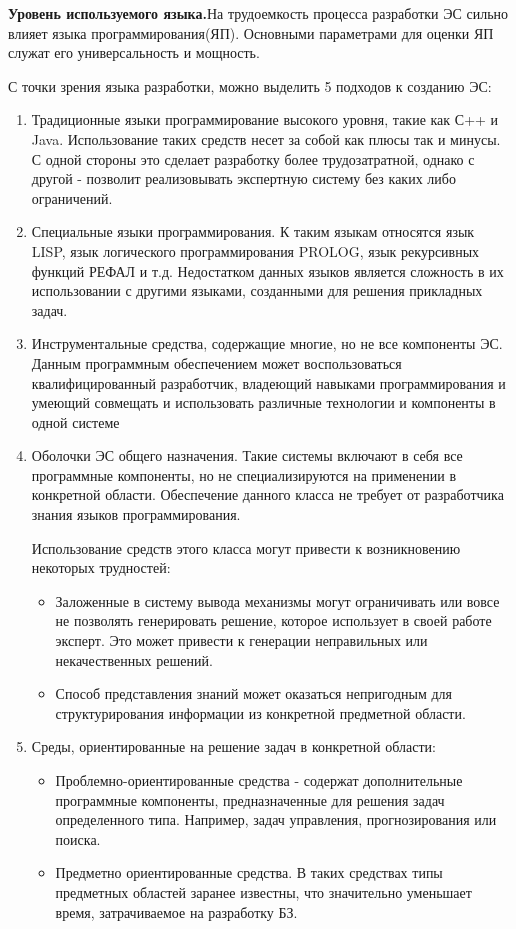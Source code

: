 \textbf{Уровень используемого языка.}На трудоемкость процесса разработки ЭС сильно влияет языка программирования(ЯП). Основными параметрами для оценки ЯП служат его универсальность и мощность.

С точки зрения языка разработки, можно выделить 5 подходов к созданию ЭС:

\begin{enumerate}
\item Традиционные языки программирование высокого уровня, такие как С++ и Java. Использование таких средств несет за собой как плюсы так и минусы. С одной стороны это сделает разработку более трудозатратной, однако с другой - позволит реализовывать экспертную систему без каких либо ограничений.

\item Специальные языки программирования. К таким языкам относятся язык LISP, язык логического программирования PROLOG, язык рекурсивных функций РЕФАЛ и т.д. Недостатком данных языков является сложность в их использовании с другими языками, созданными для решения прикладных задач.

\item Инструментальные средства, содержащие многие, но не все компоненты ЭС. Данным программным обеспечением может воспользоваться квалифицированный разработчик, владеющий навыками программирования и умеющий совмещать и использовать различные технологии и компоненты в одной системе

\item Оболочки ЭС общего назначения. Такие системы включают в себя все программные компоненты, но не специализируются на применении в конкретной области. Обеспечение данного класса не требует от разработчика знания языков программирования.

Использование средств этого класса могут привести к возникновению некоторых трудностей:

\begin{itemize}
\item Заложенные в систему вывода механизмы могут ограничивать или вовсе не позволять генерировать решение, которое использует в своей работе эксперт. Это может привести к генерации неправильных или некачественных решений. 
\item Способ представления знаний может оказаться непригодным для структурирования информации из конкретной предметной области.
\end{itemize}

\item Среды, ориентированные на решение задач в конкретной области:
\begin{itemize}
\item Проблемно-ориентированные средства - содержат дополнительные программные компоненты, предназначенные для решения задач определенного типа. Например, задач управления, прогнозирования или поиска.
\item Предметно ориентированные средства. В таких средствах типы предметных областей заранее известны, что значительно уменьшает время, затрачиваемое на разработку БЗ.
\end{itemize}

\end{enumerate}


